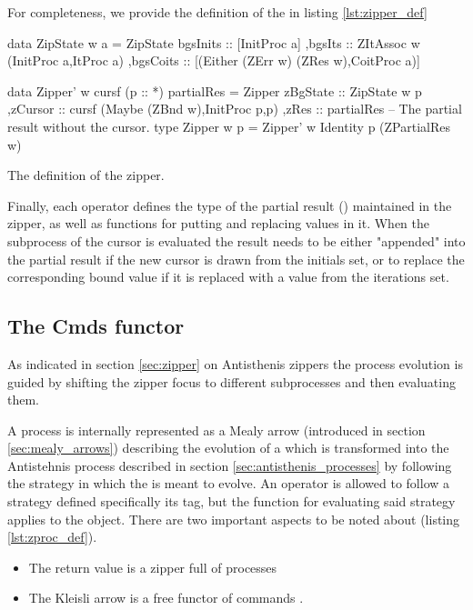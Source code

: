 For completeness, we provide the definition of the  in
listing \ref{lst:zipper_def}

\begin{code}
\begin{haskellcode}
 data ZipState w a =
  ZipState
  { bgsInits :: [InitProc a]
   ,bgsIts :: ZItAssoc w (InitProc a,ItProc a)
   ,bgsCoits :: [(Either (ZErr w) (ZRes w),CoitProc a)]
  }

data Zipper' w cursf (p :: *) partialRes =
  Zipper
  { zBgState :: ZipState w p
   ,zCursor  :: cursf (Maybe (ZBnd w),InitProc p,p)
   ,zRes     :: partialRes -- The partial result without the cursor.
  }
type Zipper w p = Zipper' w Identity p (ZPartialRes w)
\end{haskellcode}
  \caption{\label{lst:zipper_def}The definition of the zipper.}
\end{code}

Finally, each operator defines the type of the partial result ()
maintained in the zipper, as well as functions for putting and replacing values in
it. When the subprocess of the cursor is evaluated the result needs to
be either "appended" into the partial result if the new cursor is
drawn from the initials set, or to replace the corresponding bound
value if it is replaced with a value from the iterations set.

\subsection{The Cmds functor}
\label{sec:cmds_functor}

As indicated in section \ref{sec:zipper} on Antisthenis zippers
the process evolution is guided
by shifting the zipper focus to different subprocesses and then
evaluating them.

A process is internally represented as a Mealy arrow (introduced in
section \ref{sec:mealy_arrows}) describing the evolution of a
 which is transformed into the Antistehnis process
described in section \ref{sec:antisthenis_processes} by following the
strategy in which the  is meant to evolve. An operator is
allowed to follow a strategy defined specifically its
 tag, but the function for evaluating said strategy
applies to the  object. There are two important aspects to
be noted about  (listing \ref{lst:zproc_def}).

\begin{itemize}
\item The return value is a zipper full of processes 
\item The Kleisli arrow is a free functor of commands .
\end{itemize}

